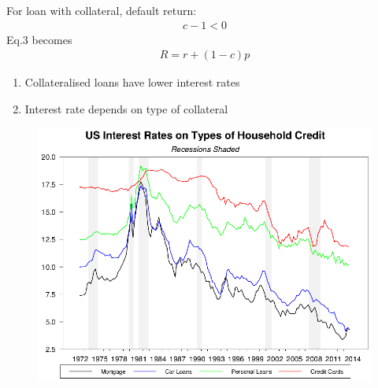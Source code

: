 \documentclass{beamer}
\begin{document}
\begin{frame}
 For loan with collateral, default return:
\begin{align}
  c-1<0  
\end{align}
\medskip
Eq.3 becomes
\begin{align}
  R=r+(1-c)p  
\end{align}
 \medskip 
 \begin{enumerate}
   \item Collateralised loans have lower interest rates
   \item Interest rate depends on type of collateral
 \end{enumerate}
\end{frame}

\begin{frame}
  \begin{figure}
    \includegraphics{us_interest_rates.eps}
  \end{figure}
\end{frame}
\end{document}
